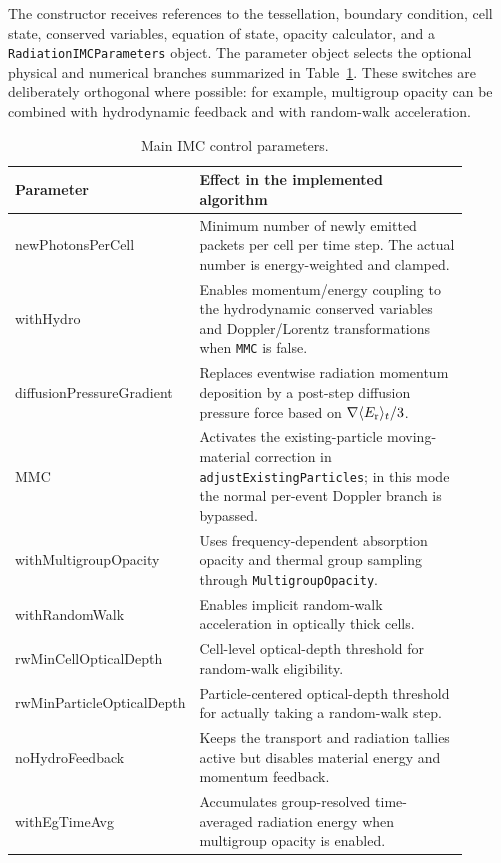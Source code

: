 \documentclass[11pt]{article}
\newcounter{algorithm}
\begin{document}
The constructor receives references to the tessellation, boundary condition,
cell state, conserved variables, equation of state, opacity calculator, and a
\texttt{RadiationIMCParameters} object. The parameter object selects the
optional physical and numerical branches summarized in
Table~\ref{tab:parameters}. These switches are deliberately orthogonal where
possible: for example, multigroup opacity can be combined with hydrodynamic
feedback and with random-walk acceleration.

\begin{table}[htbp]
\centering
\caption{Main IMC control parameters.}
\label{tab:parameters}
\begin{tabular}{>{\ttfamily}p{0.27\linewidth}p{0.63\linewidth}}
\toprule
Parameter & Effect in the implemented algorithm \\
\midrule
newPhotonsPerCell & Minimum number of newly emitted packets per cell per time step. The actual number is energy-weighted and clamped. \\
withHydro & Enables momentum/energy coupling to the hydrodynamic conserved variables and Doppler/Lorentz transformations when \texttt{MMC} is false. \\
diffusionPressureGradient & Replaces eventwise radiation momentum deposition by a post-step diffusion pressure force based on \(\nabla \langle E_{\rm r}\rangle_t/3\). \\
MMC & Activates the existing-particle moving-material correction in \texttt{adjustExistingParticles}; in this mode the normal per-event Doppler branch is bypassed. \\
withMultigroupOpacity & Uses frequency-dependent absorption opacity and thermal group sampling through \texttt{MultigroupOpacity}. \\
withRandomWalk & Enables implicit random-walk acceleration in optically thick cells. \\
rwMinCellOpticalDepth & Cell-level optical-depth threshold for random-walk eligibility. \\
rwMinParticleOpticalDepth & Particle-centered optical-depth threshold for actually taking a random-walk step. \\
noHydroFeedback & Keeps the transport and radiation tallies active but disables material energy and momentum feedback. \\
withEgTimeAvg & Accumulates group-resolved time-averaged radiation energy when multigroup opacity is enabled. \\
\bottomrule
\end{tabular}
\end{table}
\end{document}
